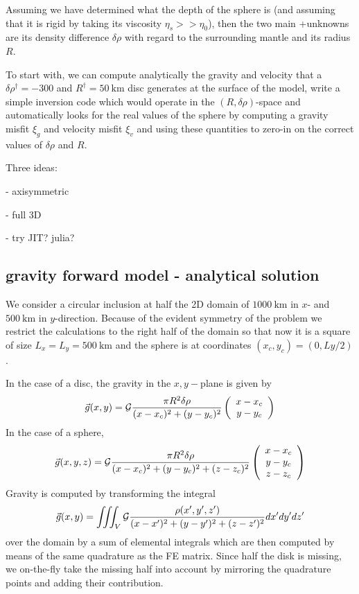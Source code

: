 Assuming we have determined what the depth of the sphere is (and assuming that 
it is rigid by taking its viscosity $\eta_s >> \eta_0$), then the two main 
+unknowns are its density difference $\delta \rho$ with regard to the surrounding mantle
and its radius $R$. 

To start with, we can compute analytically the gravity and velocity that a 
$\delta\rho^\dag=-300$ and $R^\dag=50~\si{\km}$ disc generates at the surface of the model,
write a simple inversion code which would operate in the $(R,\delta\rho)$-space 
and automatically looks for the real values of the sphere by computing a gravity misfit $\xi_g$ 
and velocity misfit $\xi_v$ and using these quantities to zero-in on the correct values 
of $\delta \rho$ and $R$.


Three ideas:

- axisymmetric

- full 3D

- try JIT? julia?


\subsection*{gravity forward model - analytical solution}

We consider a circular inclusion at half the 2D domain of 
$1000~\si{\km}$ in $x$- and $500~\si{\km}$ in $y$-direction. 
Because of the evident symmetry of the problem we restrict the 
calculations to the right half of the domain so that now it 
is a square of size $L_x=L_y=500~\si{\km}$ and the sphere is 
at coordinates $(x_c,y_c)=(0,Ly/2)$.

In the case of a disc, the gravity in the $x,y-$plane is given by 
\[
\vec{g}(x,y) = {\cal G} \frac{\pi R^2 \delta\rho}{(x-x_c)^2+(y-y_c)^2} 
\left(
\begin{array}{c}
x-x_c \\
y-y_c
\end{array}
\right)
\]
In the case of a sphere, 
\[
\vec{g}(x,y,z) = {\cal G} \frac{\pi R^2 \delta\rho}{(x-x_c)^2+(y-y_c)^2+(z-z_c)^2} 
\left(
\begin{array}{c}
x-x_c \\
y-y_c \\
z-z_c 
\end{array}
\right)
\]
Gravity is computed by transforming the integral 
\[
\vec{g}(x,y) = \iiint_V {\cal G} \frac{\rho(x',y',z')}{ (x-x')^2+(y-y')^2+(z-z')^2    } dx'dy'dz'
\]
over the domain by a sum of elemental 
integrals which are then computed by means of the same quadrature as the FE matrix. 
Since half the disk is missing, we on-the-fly take the missing half into account by 
mirroring the quadrature points and adding their contribution. 

